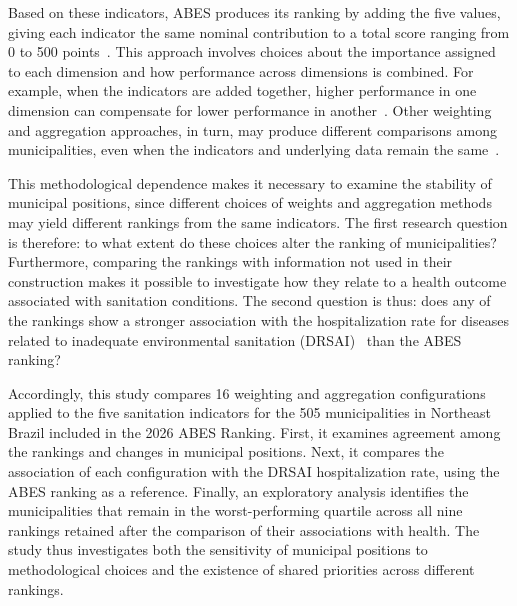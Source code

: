 Based on these indicators, ABES produces its ranking by adding the five values, giving each indicator the same nominal contribution to a total score ranging from 0 to 500 points~\cite{abes2026}. This approach involves choices about the importance assigned to each dimension and how performance across dimensions is combined. For example, when the indicators are added together, higher performance in one dimension can compensate for lower performance in another~\cite{oecd2008,munda2009,greco2019}. Other weighting and aggregation approaches, in turn, may produce different comparisons among municipalities, even when the indicators and underlying data remain the same~\cite{zanakis1998,saisana2005,greco2019}.

This methodological dependence makes it necessary to examine the stability of municipal positions, since different choices of weights and aggregation methods may yield different rankings from the same indicators. The first research question is therefore: to what extent do these choices alter the ranking of municipalities? Furthermore, comparing the rankings with information not used in their construction makes it possible to investigate how they relate to a health outcome associated with sanitation conditions. The second question is thus: does any of the rankings show a stronger association with the hospitalization rate for diseases related to inadequate environmental sanitation (DRSAI)~\cite{funasa2010} than the ABES ranking?

Accordingly, this study compares 16 weighting and aggregation configurations applied to the five sanitation indicators for the 505 municipalities in Northeast Brazil included in the 2026 ABES Ranking. First, it examines agreement among the rankings and changes in municipal positions. Next, it compares the association of each configuration with the DRSAI hospitalization rate, using the ABES ranking as a reference. Finally, an exploratory analysis identifies the municipalities that remain in the worst-performing quartile across all nine rankings retained after the comparison of their associations with health. The study thus investigates both the sensitivity of municipal positions to methodological choices and the existence of shared priorities across different rankings.